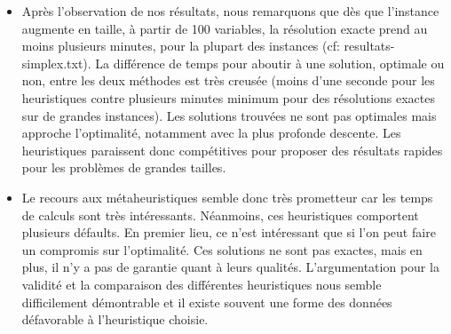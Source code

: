 %
%

\vspace{5mm}
\noindent
{}
\vspace{2mm}


\begin{itemize}

\item Après l'observation de nos résultats, nous remarquons que dès que l'instance augmente en taille, à partir de 100 variables, la résolution exacte prend au moins plusieurs minutes, pour la plupart des instances (cf: resultats-simplex.txt). La différence de temps pour aboutir à une solution, optimale ou non, entre les deux méthodes est très creusée (moins d'une seconde pour les heuristiques contre plusieurs minutes minimum pour des résolutions exactes sur de grandes instances). Les solutions trouvées ne sont pas optimales mais approche l'optimalité, notamment avec la plus profonde descente. Les heuristiques paraissent donc compétitives pour proposer des résultats rapides pour les problèmes de grandes tailles.

\item Le recours aux métaheuristiques semble donc très prometteur car les temps de calculs sont très intéressants. Néanmoins, ces heuristiques comportent plusieurs défaults. En premier lieu, ce n'est intéressant que si l'on peut faire un compromis sur l'optimalité. Ces solutions ne sont pas exactes, mais en plus, il n'y a pas de garantie quant à leurs qualités. L'argumentation pour la validité et la comparaison des différentes heuristiques nous semble difficilement démontrable et il existe souvent une forme des données défavorable à l'heuristique choisie.


\end{itemize}

